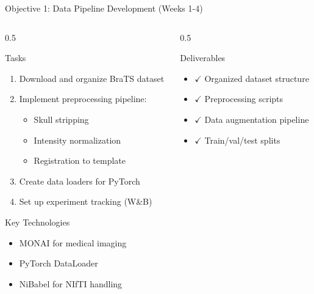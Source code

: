 \documentclass[aspectratio=169]{beamer}
\begin{document}
\begin{frame}{Objective 1: Data Pipeline Development (Weeks 1-4)}
    \begin{columns}
        \begin{column}{0.5\textwidth}
            \begin{block}{Tasks}
                \begin{enumerate}
                    \item Download and organize BraTS dataset
                    \item Implement preprocessing pipeline:
                    \begin{itemize}
                        \item Skull stripping
                        \item Intensity normalization
                        \item Registration to template
                    \end{itemize}
                    \item Create data loaders for PyTorch
                    \item Set up experiment tracking (W\&B)
                \end{enumerate}
            \end{block}
            
            \begin{block}{Key Technologies}
                \begin{itemize}
                    \item MONAI for medical imaging
                    \item PyTorch DataLoader
                    \item NiBabel for NIfTI handling
                \end{itemize}
            \end{block}
        \end{column}
        \begin{column}{0.5\textwidth}
            \begin{block}{Deliverables}
                \begin{itemize}
                    \item $\checkmark$ Organized dataset structure
                    \item $\checkmark$ Preprocessing scripts
                    \item $\checkmark$ Data augmentation pipeline
                    \item $\checkmark$ Train/val/test splits
                \end{itemize}
            \end{block}
            

\end{column}
\end{columns}
\end{frame}
\end{document}
